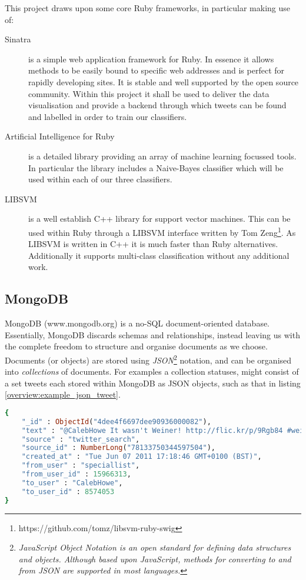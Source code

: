 This project draws upon some core Ruby frameworks, in particular making use of:

\begin{description}
	\item [Sinatra] is a simple web application framework for Ruby. In essence it allows methods to be easily bound to specific web addresses and is perfect for rapidly developing sites. It is stable and well supported by the open source community. Within this project it shall be used to deliver the data visualisation and provide a backend through which tweets can be found and labelled in order to train our classifiers.
	\item [Artificial Intelligence for Ruby] is a detailed library providing an array of machine learning focussed tools. In particular the library includes a Naive-Bayes classifier which will be used within each of our three classifiers.
	\item [LIBSVM] is a well establish C++ library for support vector machines. This can be used within Ruby through a LIBSVM interface written by Tom Zeng\footnote{https://github.com/tomz/libsvm-ruby-swig}. As LIBSVM is written in C++ it is much faster than Ruby alternatives. Additionally it supports multi-class classification without any additional work.
\end{description}

\subsection{MongoDB}

MongoDB (www.mongodb.org) is a no-SQL document-oriented database. Essentially, MongoDB discards schemas and relationships, instead leaving us with the complete freedom to structure and organise documents as we choose. Documents (or objects) are stored using \emph{JSON}\footnote{\emph{JavaScript Object Notation is an open standard for defining data structures and objects. Although based upon JavaScript, methods for converting to and from JSON are supported in most languages.}} notation, and can be organised into \emph{collections} of documents. For examples a collection statuses, might consist of a set tweets each stored within MongoDB as JSON objects, such as that in listing \ref{overview:example_json_tweet}.

\begin{lstlisting}[language=Ruby, caption={Example tweet stored within MongoDB}, label=overview:example_json_tweet]
{
	"_id" : ObjectId("4dee4f6697dee90936000082"),
	"text" : "@CalebHowe It wasn't Weiner! http://flic.kr/p/9Rgb84 #weinergate",
	"source" : "twitter_search",
	"source_id" : NumberLong("78133750344597504"),
	"created_at" : "Tue Jun 07 2011 17:18:46 GMT+0100 (BST)",
	"from_user" : "speciallist",
	"from_user_id" : 15966313,
	"to_user" : "CalebHowe",
	"to_user_id" : 8574053
}
\end{lstlisting}

